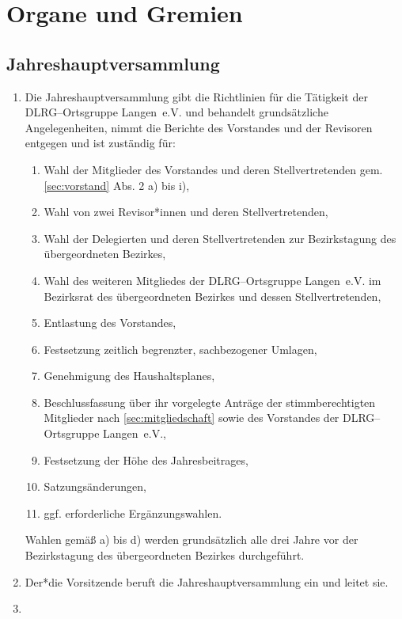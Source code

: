 \documentclass[%
12pt, %
a4paper, %
headsepline, %
parskip, %
headings=normal, %
]{scrreprt}
\begin{document}
\chapter{Organe und Gremien}
\setcounter{section}{5}
\section{Jahreshauptversammlung}
\label{sec:jahreshauptversammlung}
\begin{enumerate}
    \item Die Jahreshauptversammlung gibt die Richtlinien für die Tätigkeit der DLRG--Ortsgruppe Langen~e.V. und behandelt grundsätzliche Angelegenheiten, nimmt die Berichte des Vorstandes und der Revisoren entgegen und ist zuständig für: \begin{enumerate}[noitemsep]
        \item Wahl der Mitglieder des Vorstandes und deren Stellvertretenden gem. \ref{sec:vorstand} Abs. 2 a) bis i),
        \item Wahl von zwei Revisor*innen und deren Stellvertretenden,
        \item Wahl der Delegierten und deren Stellvertretenden zur Bezirkstagung des übergeordneten Bezirkes,
        \item Wahl des weiteren Mitgliedes der DLRG--Ortsgruppe Langen~e.V. im Bezirksrat des übergeordneten Bezirkes und dessen Stellvertretenden,
        \item Entlastung des Vorstandes,
        \item Festsetzung zeitlich begrenzter, sachbezogener Umlagen,
        \item Genehmigung des Haushaltsplanes,
        \item Beschlussfassung über ihr vorgelegte Anträge der stimmberechtigten Mitglieder nach \ref{sec:mitgliedschaft} sowie des Vorstandes der DLRG--Ortsgruppe Langen~e.V.,
        \item Festsetzung der Höhe des Jahresbeitrages,
        \item Satzungsänderungen,
        \item ggf. erforderliche Ergänzungswahlen.
    \end{enumerate}
    Wahlen gemäß a) bis d) werden grundsätzlich alle drei Jahre vor der Bezirkstagung des übergeordneten Bezirkes durchgeführt.
    \item Der*die Vorsitzende beruft die Jahreshauptversammlung ein und leitet sie.
    \item \begin{enumerate}[noitemsep]

\end{enumerate}
\end{enumerate}
\end{document}

